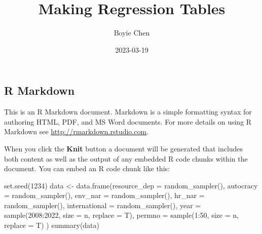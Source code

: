\documentclass[
]{article}
\title{Making Regression Tables}
\author{Boyie Chen}
\date{2023-03-19}
\newenvironment{Shaded}{\begin{snugshade}}{\end{snugshade}}
\newcommand{\AttributeTok}[1]{\textcolor[rgb]{0.77,0.63,0.00}{#1}}
\newcommand{\DecValTok}[1]{\textcolor[rgb]{0.00,0.00,0.81}{#1}}
\newcommand{\FunctionTok}[1]{\textcolor[rgb]{0.00,0.00,0.00}{#1}}
\newcommand{\NormalTok}[1]{#1}
\newcommand{\OtherTok}[1]{\textcolor[rgb]{0.56,0.35,0.01}{#1}}
\newcommand{\SpecialCharTok}[1]{\textcolor[rgb]{0.00,0.00,0.00}{#1}}
\begin{document}
\maketitle

\hypertarget{r-markdown}{%
\subsection{R Markdown}\label{r-markdown}}

This is an R Markdown document. Markdown is a simple formatting syntax
for authoring HTML, PDF, and MS Word documents. For more details on
using R Markdown see \url{http://rmarkdown.rstudio.com}.

When you click the \textbf{Knit} button a document will be generated
that includes both content as well as the output of any embedded R code
chunks within the document. You can embed an R code chunk like this:

\begin{Shaded}
\begin{Highlighting}[]
\FunctionTok{set.seed}\NormalTok{(}\DecValTok{1234}\NormalTok{)}
\NormalTok{data }\OtherTok{\textless{}{-}} \FunctionTok{data.frame}\NormalTok{(}\AttributeTok{resource\_dep =} \FunctionTok{random\_sampler}\NormalTok{(),}
                   \AttributeTok{autocracy =} \FunctionTok{random\_sampler}\NormalTok{(),}
                   \AttributeTok{env\_nar =} \FunctionTok{random\_sampler}\NormalTok{(),}
                   \AttributeTok{hr\_nar =} \FunctionTok{random\_sampler}\NormalTok{(),}
                   \AttributeTok{international =} \FunctionTok{random\_sampler}\NormalTok{(),}
                   \AttributeTok{year =} \FunctionTok{sample}\NormalTok{(}\DecValTok{2008}\SpecialCharTok{:}\DecValTok{2022}\NormalTok{, }\AttributeTok{size =}\NormalTok{ n, }\AttributeTok{replace =}\NormalTok{ T),}
                   \AttributeTok{permno =} \FunctionTok{sample}\NormalTok{(}\DecValTok{1}\SpecialCharTok{:}\DecValTok{50}\NormalTok{, }\AttributeTok{size =}\NormalTok{ n, }\AttributeTok{replace =}\NormalTok{ T)}
\NormalTok{                   )}
\FunctionTok{summary}\NormalTok{(data)}
\end{Highlighting}
\end{Shaded}
\end{document}
